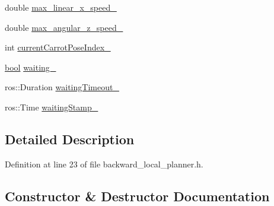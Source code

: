 \begin{DoxyCompactItemize}
double \hyperlink{classcl__move__base__z_1_1backward__local__planner_1_1BackwardLocalPlanner_ae4399072e9ae9cc60d8837860dc4807b}{max\+\_\+linear\+\_\+x\+\_\+speed\+\_\+}
\item 
double \hyperlink{classcl__move__base__z_1_1backward__local__planner_1_1BackwardLocalPlanner_af7e492339ee2d1c90c00f6dd4cf95551}{max\+\_\+angular\+\_\+z\+\_\+speed\+\_\+}
\item 
int \hyperlink{classcl__move__base__z_1_1backward__local__planner_1_1BackwardLocalPlanner_a2e8f2b78bc97f27c5fa431f3af2261ed}{current\+Carrot\+Pose\+Index\+\_\+}
\item 
\hyperlink{classbool}{bool} \hyperlink{classcl__move__base__z_1_1backward__local__planner_1_1BackwardLocalPlanner_a00849266e4bdd9379c3717e8a41c303e}{waiting\+\_\+}
\item 
ros\+::\+Duration \hyperlink{classcl__move__base__z_1_1backward__local__planner_1_1BackwardLocalPlanner_a0c15da985f7f051164adb643c03a0c90}{waiting\+Timeout\+\_\+}
\item 
ros\+::\+Time \hyperlink{classcl__move__base__z_1_1backward__local__planner_1_1BackwardLocalPlanner_abe08faab5b784fcf64ac6b3f936459f1}{waiting\+Stamp\+\_\+}
\end{DoxyCompactItemize}


\subsection{Detailed Description}


Definition at line 23 of file backward\+\_\+local\+\_\+planner.\+h.



\subsection{Constructor \& Destructor Documentation}
\mbox{\label{classcl__move__base__z_1_1backward__local__planner_1_1BackwardLocalPlanner_a79e73a858b2a13c7fe10c52e08568fd6}} 
